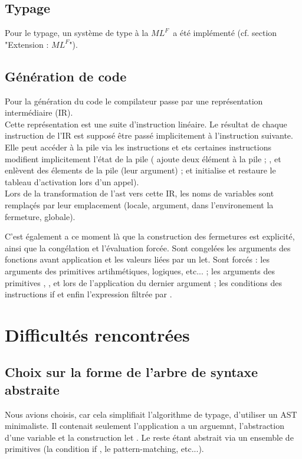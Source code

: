 \documentclass[a4paper]{article}
\def\mlf{$ML^F$}
\begin{document}
\subsection{Typage}
Pour le typage, un système de type \og à la \mlf \fg ~a été implémenté
(cf. section "Extension : \mlf"). %

\subsection{Génération de code}
Pour la génération du code le compilateur passe par une représentation intermédiaire (IR). \\
Cette représentation est une suite d'instruction linéaire. Le résultat de chaque instruction de l'IR est supposé être passé implicitement à l'instruction suivante. \\
Elle peut accéder à la pile via les instructions  et  ets certaines instructions modifient implicitement l'état de la pile ( ajoute deux élément à la pile ; ,  et  enlèvent des élements de la pile (leur argument) ;  et  initialise et restaure le tableau d'activation lors d'un appel). \\
Lors de la transformation de l'ast vers cette IR, les noms de
variables sont remplaçés par leur emplacement (locale, argument, dans
l'environement la fermeture, globale).

C'est également a ce moment là que la construction des fermetures est
explicité, ainsi que la congélation et l'évaluation forcée. Sont
congelées les arguments des fonctions avant application et les valeurs
liées par un let. Sont forcés : les arguments des primitives
artihmétiques, logiques, etc... ; les arguments des primitives
, ,  et  lors de
l'application du dernier argument ; les conditions des instructions if
et enfin l'expression filtrée par .


\section{Difficultés rencontrées}

\subsection{Choix sur la forme de l'arbre de syntaxe abstraite}
Nous avions choisis, car cela simplifiait l'algorithme de typage,
d'utiliser un AST minimaliste. Il contenait seulement l'application a
un arguemnt, l'abstraction d'une variable et la construction \og let
\fg. Le reste étant abstrait via un ensemble de primitives (la
condition \og if \fg, le pattern-matching, etc...).
\end{document}
